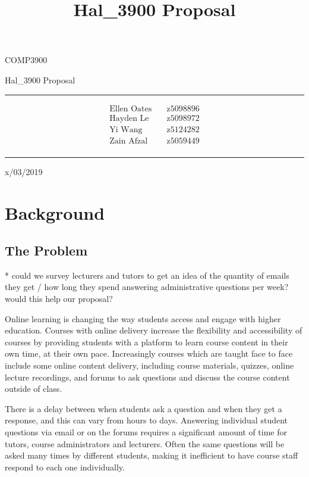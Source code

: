 \documentclass{article}
\title{Hal\_3900 Proposal}
\begin{document}
\begin{LARGE}
\begin{center}
\vspace*{15mm}

COMP3900

Hal\_3900 Proposal

\rule[4.5pt]{0.61\textwidth}{0.3pt}

\begin{align*}
  \text{Ellen Oates}    \quad   &\text{z5098896} \\
  \text{Hayden Le}      \quad   &\text{z5098972} \\
  \text{Yi Wang}        \quad   &\text{z5124282} \\
  \text{Zain Afzal}     \quad   &\text{z5059449} \\
\end{align*}

\rule[4.5pt]{0.61\textwidth}{0.3pt}

x/03/2019

\end{center}
\end{LARGE}
\newpage


\section{Background}
\subsection{The Problem}
* could we survey lecturers and tutors to get an idea of the quantity of emails they get / 
how long they spend answering administrative questions per week? would this help our proposal?

Online learning is changing the way students access and engage with higher education. Courses with 
online delivery increase the flexibility and accessibility of courses by providing students
with a platform to learn course content in their own time, at their own pace. Increasingly courses which are 
taught face to face include some online content delivery, including course materials, quizzes, online lecture recordings,
and forums to ask questions and discuss the course content outside of class.   

There is a delay between when students ask a question and when they get a response, and this can vary from hours to days.
Answering individual student questions via email or on the forums requires a significant amount of time for tutors, course administrators and lecturers. 
Often the same questions will be asked many times by different students, making it inefficient to have course staff respond to each one individually.
\end{document}
